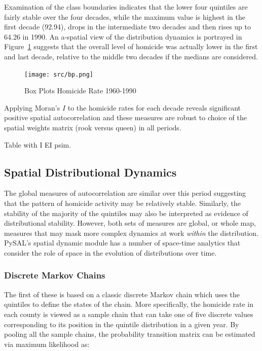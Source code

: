 \documentclass[11pt, titlepage]{article}
\begin{document}
Examination of the class boundaries indicates that the lower four
quintiles are fairly stable over the four decades, while the maximum
value is highest in the first decade (92.94), drops in the intermediate two
decades and then rises up to 64.26 in 1990. An a-spatial view of the
distribution dynamics is portrayed in Figure~\ref{f:bp} suggests that the overall level
of homicide was actually lower in the first and last decade, relative to
the middle two decades if the medians are considered.


\begin{figure}[ht]
\begin{center}
\texttt{[image: src/bp.png]}
\end{center}
\caption{Box Plots Homicide Rate 1960-1990}
\label{f:bp}
\end{figure}   


Applying Moran's $I$ to the homicide rates for each decade reveals
significant positive spatial autocorrelation and these measures are
robust to choice of the spatial weights matrix (rook versus queen) in
all periods.

Table with I EI psim.

\subsection{Spatial Distributional Dynamics}

The global measures of autocorrelation are similar over this period
suggesting that the pattern of homicide activity may be relatively
stable. Similarly, the stability of the majority of the quintiles may
also be interpreted as evidence of distributional stability. However,
both sets of measures are global, or whole map, measures that may mask
more complex dynamics at work \emph{within} the distribution. PySAL's
spatial dynamic module has a number of space-time analytics that
consider the role of space in the evolution of distributions over time.

\subsubsection{Discrete Markov Chains}

The first of these is based on a classic discrete Markov chain which
uses the quintiles to define the states of the chain. More specifically,
the homicide rate in each county is viewed as a sample chain that can
take one of five discrete values corresponding to its position in the
quintile distribution in a given year. By pooling all the sample chains,
the probability transition matrix can be estimated via maximum
likelihood as:
\end{document}
